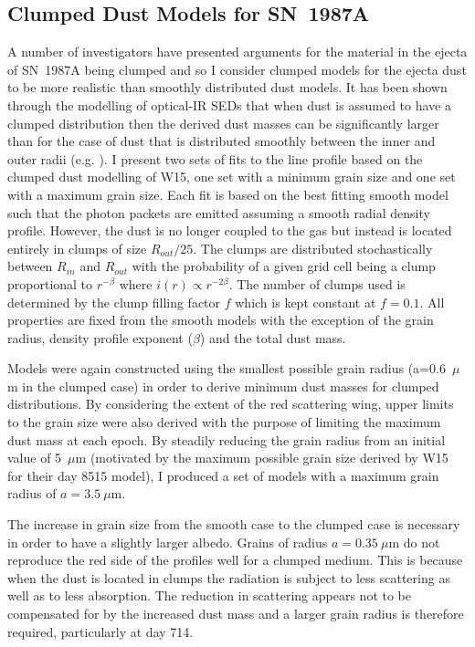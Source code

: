 \subsection{Clumped Dust Models for SN~1987A}
\label{clumped_models}

A number of investigators have presented arguments for the material in the 
ejecta of SN~1987A being clumped \citep{Lucy1991,Li1992,Kozma1998b} and so 
I consider clumped models for the ejecta dust to be more realistic than 
smoothly distributed dust models. It has been shown through the modelling 
of optical-IR SEDs that when dust is assumed to have a clumped 
distribution then the derived dust masses can be significantly larger than 
for the case of dust that is distributed smoothly between the inner and 
outer radii (e.g. \citet{Ercolano2007,Owen2015}). I present two sets of 
fits to the line profile based on the clumped dust modelling of W15, one 
set with a minimum grain size and one set with a maximum grain size.  
Each fit is based on the best fitting smooth model such that the photon 
packets are emitted assuming a smooth radial density profile.  However, 
the dust is no longer coupled to the gas but instead is located entirely 
in clumps of size $R_{out}/25$.  The clumps are distributed stochastically 
between $R_{in}$ and $R_{out}$ with the probability of a given grid cell 
being a clump proportional to $r^{- \beta }$ where $i(r) \propto r^{-2 
\beta}$.  The number of clumps used is determined by the clump filling 
factor $f$ which is kept constant at $f=0.1$.  All properties are fixed 
from the smooth models with the exception of the grain radius, density 
profile exponent ($\beta$) and the total dust mass.

Models were again constructed using the smallest possible grain radius (a=0.6~$\mu$m in the clumped case) in order to derive minimum dust masses 
for clumped distributions.  By considering the extent of the red 
scattering wing, upper limits to the grain size were also derived with the 
purpose of limiting the maximum dust mass at each epoch.  By steadily 
reducing the grain radius from an initial value of 5~$\mu$m (motivated by 
the maximum possible grain size derived by W15 for their day 8515 model), 
I produced a set of models with a maximum grain radius of $a=3.5~\mu$m.  



The increase in grain size from the smooth case to the clumped case is 
necessary in order to have a slightly larger albedo.  Grains of radius 
$a=0.35~\mu$m do not reproduce the red side of the profiles well for a 
clumped medium.  This is because when the dust is located in clumps the 
radiation is subject to less scattering as well as to less absorption.  
The reduction in scattering appears not to be compensated for by the 
increased dust mass and a larger grain radius is therefore required, 
particularly at day 714.

